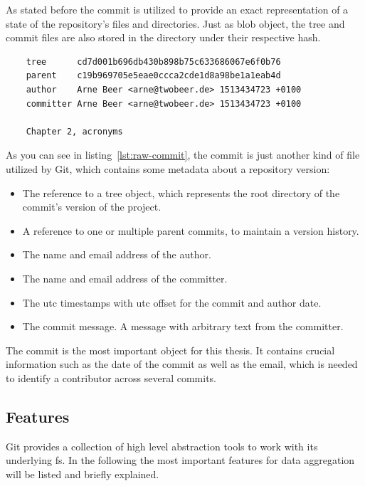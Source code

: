 As stated before the commit is utilized to provide an exact representation of a state of the repository's files and directories.
Just as blob object, the tree and commit files are also stored in the  directory under their respective hash.

\begin{verbatim}
    tree      cd7d001b696db430b898b75c633686067e6f0b76
    parent    c19b969705e5eae0ccca2cde1d8a98be1a1eab4d
    author    Arne Beer <arne@twobeer.de> 1513434723 +0100
    committer Arne Beer <arne@twobeer.de> 1513434723 +0100

    Chapter 2, acronyms
\end{verbatim}
\begingroup
{}
\endgroup

As you can see in listing~\ref{lst:raw-commit}, the commit is just another kind of file utilized by Git, which contains some metadata about a repository version:

\begin{itemize}
    \item The reference to a tree object, which represents the root directory of the commit's version of the project.
    \item A reference to one or multiple parent commits, to maintain a version history.
    \item The name and email address of the author.
    \item The name and email address of the committer.
    \item The \ac{utc} timestamps with \ac{utc} offset for the commit and author date.
    \item The commit message. A message with arbitrary text from the committer.
\end{itemize}

The commit is the most important object for this thesis.
It contains crucial information such as the date of the commit as well as the email, which is needed to identify a contributor across several commits.

\subsection{Features}
Git provides a collection of high level abstraction tools to work with its underlying \ac{fs}.
In the following the most important features for data aggregation will be listed and briefly explained.

